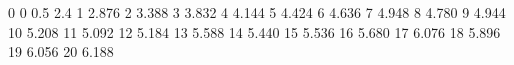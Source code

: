 0 0
0.5 2.4
1 2.876
2 3.388
3 3.832
4 4.144
5 4.424
6 4.636
7 4.948
8 4.780
9 4.944
10 5.208
11 5.092
12 5.184
13 5.588
14 5.440
15 5.536
16 5.680
17 6.076
18 5.896
19 6.056
20 6.188
